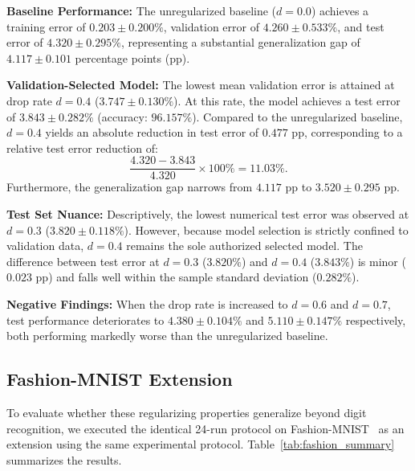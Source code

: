 \documentclass[conference]{IEEEtran}
\begin{document}
\textbf{Baseline Performance:} The unregularized baseline ($d=0.0$) achieves a training error of $0.203 \pm 0.200\%$, validation error of $4.260 \pm 0.533\%$, and test error of $4.320 \pm 0.295\%$, representing a substantial generalization gap of $4.117 \pm 0.101$ percentage points (pp).

\textbf{Validation-Selected Model:} The lowest mean validation error is attained at drop rate $d=0.4$ ($3.747 \pm 0.130\%$). At this rate, the model achieves a test error of $3.843 \pm 0.282\%$ (accuracy: $96.157\%$). Compared to the unregularized baseline, $d=0.4$ yields an absolute reduction in test error of $0.477$ pp, corresponding to a relative test error reduction of:
\begin{equation}
\frac{4.320 - 3.843}{4.320} \times 100\% = 11.03\%.
\end{equation}
Furthermore, the generalization gap narrows from $4.117$ pp to $3.520 \pm 0.295$ pp.

\textbf{Test Set Nuance:} Descriptively, the lowest numerical test error was observed at $d=0.3$ ($3.820 \pm 0.118\%$). However, because model selection is strictly confined to validation data, $d=0.4$ remains the sole authorized selected model. The difference between test error at $d=0.3$ ($3.820\%$) and $d=0.4$ ($3.843\%$) is minor ($0.023$ pp) and falls well within the sample standard deviation ($0.282\%$).

\textbf{Negative Findings:} When the drop rate is increased to $d=0.6$ and $d=0.7$, test performance deteriorates to $4.380 \pm 0.104\%$ and $5.110 \pm 0.147\%$ respectively, both performing markedly worse than the unregularized baseline.

\subsection{Fashion-MNIST Extension}
To evaluate whether these regularizing properties generalize beyond digit recognition, we executed the identical 24-run protocol on Fashion-MNIST~\cite{xiao2017fashion} as an extension using the same experimental protocol. Table~\ref{tab:fashion_summary} summarizes the results.
\end{document}
